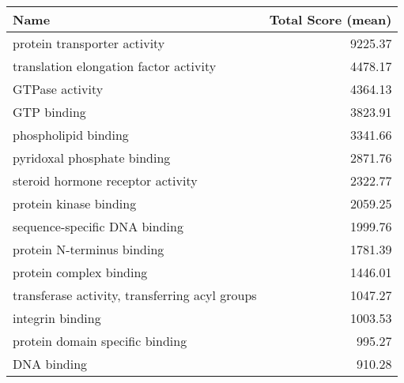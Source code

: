 \begin{table}[hp]
\begin{center} \sf
\begin{tabular}{p{}r}
\toprule
\textbf{Name}                                                 & \textbf{Total Score (mean)} \\ \midrule
protein transporter activity                                  & 9225.37                     \\
translation elongation factor activity                        & 4478.17                     \\ %
GTPase activity                                               & 4364.13                     \\
GTP binding                                                   & 3823.91                     \\
phospholipid binding                                          & 3341.66                     \\
pyridoxal phosphate binding                                   & 2871.76                     \\
steroid hormone receptor activity                             & 2322.77                     \\ %
protein kinase binding                                        & 2059.25                     \\
sequence-specific DNA binding                                 & 1999.76                     \\ %
protein N-terminus binding                                    & 1781.39                     \\
protein complex binding                                       & 1446.01                     \\
transferase activity, transferring acyl groups                & 1047.27                     \\
integrin binding                                              & 1003.53                     \\
protein domain specific binding                               & 995.27                      \\
DNA binding                                                   & 910.28                      \\ %

\end{tabular}
\end{center}
\end{table}
